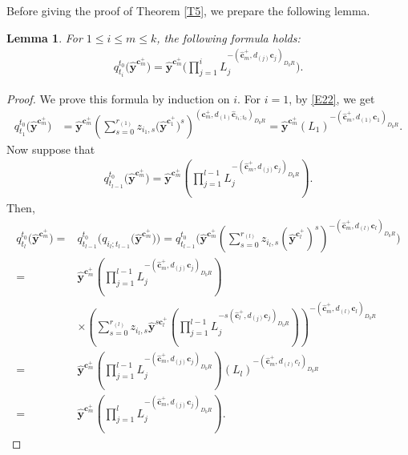 \documentclass[pdftex]{sigma}
\numberwithin{equation}{section}
\newtheorem{Lemma}[Theorem]{Lemma}
\begin{document}
Before giving the proof of Theorem \ref{T5}, we prepare the following lemma.
\begin{Lemma}\label{L3}
For $1\leq i\leq m\leq k$, the following formula holds:
 \begin{align}\label{eq:q_t-formula}
 q_{t_i}^{t_0}\bigl(\hat{\mathbf{y}}^{\mathbf{c}_{m}^+}\bigr)=\hat{\mathbf{y}}^{\mathbf{c}_{m}^+}
 \Biggl(\prod\limits_{j=1}^{i}L_j^{-(\mathbf{\hat{c}}_{m}^+,d_{(j)}\mathbf{c}_{j})_{D_0R}}\Biggr).
 \end{align}

\end{Lemma}
\begin{proof}
 We prove this formula by induction on $i$.
 For $i=1$, by \eqref{E22}, we get
\begin{align*}
 q_{t_{1}}^{t_0}\bigl(\hat{\mathbf{y}}^{\mathbf{c}_{m}^+}\bigr)&=\hat{\mathbf{y}}^{\mathbf{c}_{m}^+}
 \left(\sum\limits_{s=0}^{r_{(1)}}z_{i_1,s}\bigl(\hat{\mathbf{y}}^{\mathbf{c}_{1}^+}\bigr)^s\right)^{(\mathbf{c}_{m}^+,d_{(1)}\mathbf{\hat{c}}_{i_{1};t_{0}})_{D_0R}}=\hat{\mathbf{y}}^{\mathbf{c}_{m}^+}(L_1)^{-(\mathbf{\hat{c}}_{m}^+,d_{(1)}\mathbf{c}_{1})_{D_0R}}.
\end{align*}
Now suppose that
\begin{align*}
 q_{t_{l-1}}^{t_0}\bigl(\hat{\mathbf{y}}^{\mathbf{c}_{m}^+}\bigr)=\hat{\mathbf{y}}^{\mathbf{c}_{m}^+}
 \left(\prod\limits_{j=1}^{l-1}L_j^{-(\mathbf{\hat{c}}_{m}^+,d_{(j)}\mathbf{c}_{j})_{D_0R}}\right).
\end{align*}
Then,
\begin{align*}
 q_{t_l}^{t_0}\bigl(\hat{\mathbf{y}}^{\mathbf{c}_{m}^+}\bigr)={}&q_{t_{l-1}}^{t_0}\bigl(q_{i_l;t_{l-1}}\bigl(\hat{\mathbf{y}}^{\mathbf{c}_{m}^+}\bigr)\bigr)
 =q_{t_{l-1}}^{t_0}\Biggl(\hat{\mathbf{y}}^{\mathbf{c}_{m}^+}
 \left(\sum\limits_{s=0}^{r_{(l)}}z_{i_l,s}(\hat{\mathbf{y}}^{\mathbf{c}_{l}^+})^s\right)^{-(\mathbf{\hat{c}}_{m}^+,d_{(l)}\mathbf{c}_{l})_{D_0R}}\Biggr)\\
 ={}&\hat{\mathbf{y}}^{\mathbf{c}_{m}^+}\left(\prod\limits_{j=1}^{l-1}L_j^{-(\mathbf{\hat{c}}_{m}^+,d_{(j)}\mathbf{c}_{j})_{D_0R}}\right)\\
&\times\left(\sum\limits_{s=0}^{r_{(l)}}z_{i_l,s}\hat{\mathbf{y}}^{s \mathbf{c}_{l}^+}
\left(\prod\limits_{j=1}^{l-1}L_j^{-s(\mathbf{\hat{c}}_{l}^+,d_{(j)}\mathbf{c}_{j})_{D_0R}}\right)\right)^{-(\mathbf{\hat{c}}_{m}^+,d_{(l)}\mathbf{c}_{l})_{D_0R}}\\
={}&\hat{\mathbf{y}}^{\mathbf{c}_{m}^+}\left(\prod\limits_{j=1}^{l-1}L_j^{-(\mathbf{\hat{c}}_{m}^+,d_{(j)}\mathbf{c}_{j})_{D_0R}}\right)
(L_l)^{-(\mathbf{\hat{c}}_{m}^+,d_{(l)}\mathbf{}c_{l})_{D_0R}}\\
={}&\hat{\mathbf{y}}^{\mathbf{c}_{m}^+}\left(\prod\limits_{j=1}^{l}L_j^{-(\mathbf{\hat{c}}_{m}^+,d_{(j)}\mathbf{c}_{j})_{D_0R}}\right).\tag*{\qed}
\end{align*} \renewcommand{\qed}{}
\end{proof}
\end{document}
